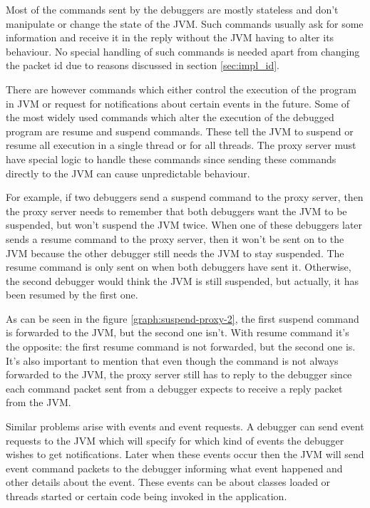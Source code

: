 \documentclass[..thesis.tex]{subfiles}
\begin{document}
Most of the commands sent by the debuggers are mostly stateless and don't manipulate or change the state of the JVM.
Such commands usually ask for some information and receive it in the reply without the JVM having to alter its behaviour.
No special handling of such commands is needed apart from changing the packet id due to reasons discussed in section \ref{sec:impl_id}.

There are however commands which either control the execution of the program in JVM or request for notifications about certain events in the future.
Some of the most widely used commands which alter the execution of the debugged program are resume and suspend commands.
These tell the JVM to suspend or resume all execution in a single thread or for all threads.
The proxy server must have special logic to handle these commands since sending these commands directly to the JVM can cause unpredictable behaviour.

For example, if two debuggers send a suspend command to the proxy server, then the proxy server needs to remember that both debuggers want the JVM to be suspended, but won't suspend the JVM twice.
When one of these debuggers later sends a resume command to the proxy server, then it won't be sent on to the JVM because the other debugger still needs the JVM to stay suspended.
The resume command is only sent on when both debuggers have sent it.
Otherwise, the second debugger would think the JVM is still suspended, but actually, it has been resumed by the first one.



As can be seen in the figure \ref{graph:suspend-proxy-2}, the first suspend command is forwarded to the JVM, but the second one isn't. 
With resume command it's the opposite: the first resume command is not forwarded, but the second one is.
It's also important to mention that even though the command is not always forwarded to the JVM, the proxy server still has to reply to the debugger since each command packet sent from a debugger expects to receive a reply packet from the JVM.

Similar problems arise with events and event requests.
A debugger can send event requests to the JVM which will specify for which kind of events the debugger wishes to get notifications.
Later when these events occur then the JVM will send event command packets to the debugger informing what event happened and other details about the event.
These events can be about classes loaded or threads started or certain code being invoked in the application.
\end{document}
